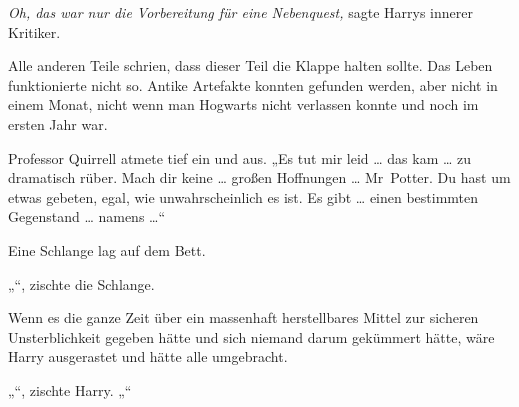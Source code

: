 \emph{Oh, das war nur die Vorbereitung für eine Nebenquest,} sagte Harrys innerer Kritiker.

Alle anderen Teile schrien, dass dieser Teil die Klappe halten sollte. Das Leben funktionierte nicht so. Antike Artefakte konnten gefunden werden, aber nicht in einem Monat, nicht wenn man Hogwarts nicht verlassen konnte und noch im ersten Jahr war.

Professor Quirrell atmete tief ein und aus.
„Es tut mir leid … das kam … zu dramatisch rüber. Mach dir keine … großen Hoffnungen … Mr~Potter. Du hast um etwas gebeten, egal, wie unwahrscheinlich es ist. Es gibt … einen bestimmten Gegenstand … namens …“

Eine Schlange lag auf dem Bett.

„“, zischte die Schlange.

Wenn es die ganze Zeit über ein massenhaft herstellbares Mittel zur sicheren Unsterblichkeit gegeben hätte und sich niemand darum gekümmert hätte, wäre Harry ausgerastet und hätte alle umgebracht.

„“, zischte Harry. „“

